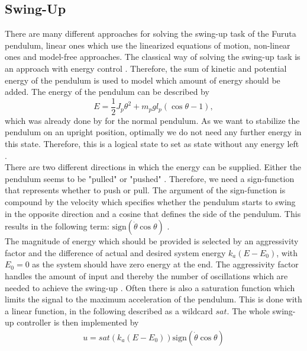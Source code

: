 \subsection{Swing-Up}
There are many different approaches for solving the swing-up task of the Furuta 
pendulum, linear ones which use the linearized equations of motion, non-linear 
ones and model-free approaches. The classical way of solving the swing-up task 
is 
an approach with energy control \citep{seman2013swinging}. Therefore, the sum 
of 
kinetic and potential energy of the pendulum is used to model which amount of 
energy should be added. The energy of the pendulum can be described by 
\[E = \frac{1}{2}J_p\theta^2+m_pgl_p(\cos \theta -1),\] which was already done 
by \cite{aastrom2000swinging} for the normal pendulum.
As we want to stabilize the pendulum on an upright position, optimally we do 
not need any further energy in this state. Therefore, this is a logical state 
to set as state without any energy left \citep{seman2013swinging}.\\
There are two different directions in which the 
energy can be supplied. Either the pendulum seems to be "pulled" or "pushed" 
\cite{seman2013swinging}. Therefore, we need a sign-function that represents 
whether to push or pull. The argument of the sign-function is compound by the 
velocity which specifies whether the pendulum starts to swing in the opposite 
direction and a cosine that defines the side of the pendulum. This results in 
the following term: $\text{sign}(\dot{\theta}\cos\theta)$ 
\citep{awtar2002inverted}. \\
The magnitude of energy which should be provided is 
selected by an aggressivity factor and the difference of actual and desired 
system energy $k_a(E-E_0)$, with $E_0=0$ as the system should have zero energy 
at the end. The aggressivity factor handles the amount of input 
and thereby the number of oscillations which are needed to achieve the 
swing-up \cite{awtar2002inverted}. Often there is also a saturation function 
which 
limits the signal to the maximum acceleration of the pendulum. This is done 
with a linear function, in the following described as a wildcard $sat$. The 
whole 
swing-up controller is then implemented by 
\begin{align*}
u = sat(k_a(E-E_0))\text{sign}(\dot{\theta}\cos\theta)
\end{align*}
